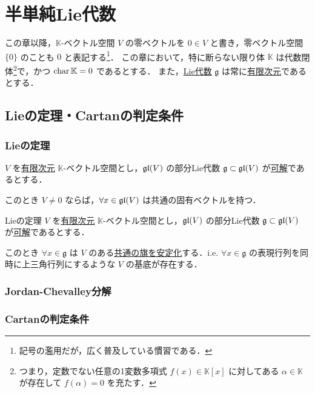 \documentclass[rep_main]{subfiles}
\begin{document}
\setcounter{chapter}{1}

\chapter{半単純Lie代数}

この章以降，$\mathbb{K}$-ベクトル空間 $V$ の零ベクトルを $0 \in V$ と書き，零ベクトル空間 $\{0\}$ のことも $0$ と表記する\footnote{記号の濫用だが，広く普及している慣習である．}．
この章において，特に断らない限り体 $\mathbb{K}$ は代数閉体\footnote{つまり，定数でない任意の1変数多項式 $f(x) \in \mathbb{K}[x]$ に対してある $\alpha \in \mathbb{K}$ が存在して $f(\alpha) = 0$ を充たす．}で，かつ $\operatorname{char} \mathbb{K} = 0$ であるとする．
また，\hyperref[ax:LieAlg]{Lie代数} $\mathfrak{g}$ は常に\underline{有限次元}であるとする．
\section{Lieの定理・Cartanの判定条件}

\subsection{Lieの定理}

\begin{mytheo}[label=thm:eigen-Lie]{}
	$V$ を\underline{有限次元} $\mathbb{K}$-ベクトル空間とし，$\mathfrak{gl} (V)$ の部分Lie代数 $\mathfrak{g} \subset \mathfrak{gl} (V)$ が\hyperref[def:solvable-LieAlg]{可解}であるとする．

	このとき $V \neq 0$ ならば，$\forall x \in \mathfrak{gl} (V)$ は共通の固有ベクトルを持つ．
\end{mytheo}

\begin{mycol}[label=thm:Lie]{Lieの定理}
	$V$ を\underline{有限次元} $\mathbb{K}$-ベクトル空間とし，$\mathfrak{gl} (V)$ の部分Lie代数 $\mathfrak{g} \subset \mathfrak{gl} (V)$ が\hyperref[def:solvable-LieAlg]{可解}であるとする．

	このとき $\forall x \in \mathfrak{g}$ は $V$ のある\underline{共通の}\hyperref[def:flag]{旗を安定化}する．i.e. $\forall x \in \mathfrak{g}$ の表現行列を同時に上三角行列にするような $V$ の基底が存在する．
\end{mycol}


\subsection{Jordan-Chevalley分解}

\subsection{Cartanの判定条件}
\end{document}
